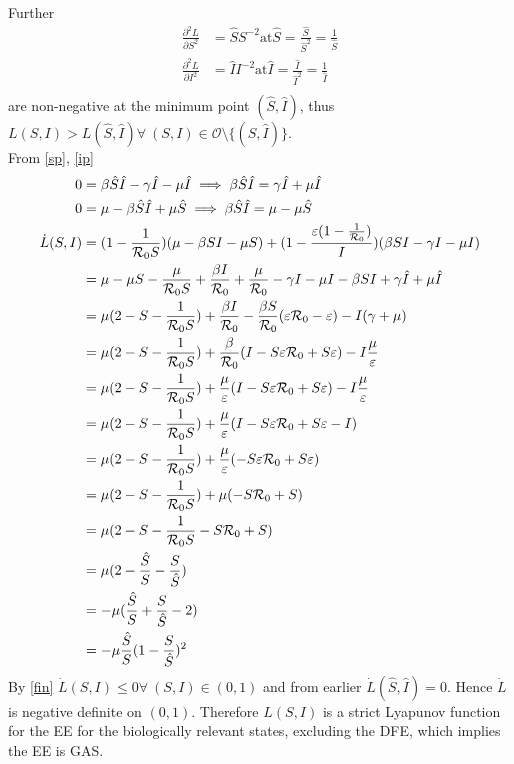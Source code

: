 Further
\begin{align}
    \frac{\partial^2 L}{\partial S^2} &= \hat{S}S^{-2} \textrm{at} \hat{S} = \frac{\hat{S}}{\hat{S}^2} = \frac{1}{\hat{S}}\nonumber\\
    \frac{\partial^2 L}{\partial I^2} &= \hat{I}I^{-2} \textrm{at} \hat{I} = \frac{\hat{I}}{\hat{I}^2} = \frac{1}{\hat{I}}\nonumber\\
\end{align}
are non-negative at the minimum point $(\hat{S},\hat{I})$, thus $L(S,I) > L(\hat{S},\hat{I}) \forall\ (S,I) \in {\mathcal O} \setminus \{(\hat{S},\hat{I})\}$.\\
From \ref{sp}, \ref{ip}
\begin{align}
    0 &= \beta \hat{S} \hat{I} - \gamma \hat{I} - \mu \hat{I} \implies \beta \hat{S} \hat{I} = \gamma \hat{I} + \mu \hat{I}\nonumber\\
    0 &= \mu - \beta \hat{S} \hat{I} + \mu \hat{S} \implies \beta \hat{S} \hat{I} = \mu - \mu \hat{S}\nonumber\\
    \dot{L}(S,I) &= (1-\frac{1}{{\mathcal R_0} S})(\mu - \beta SI - \mu S) + (1 - \frac{\varepsilon(1 - \frac{1}{{\mathcal R_0}})}{I})(\beta SI - \gamma I - \mu I)\nonumber\\
            &= \mu - \mu S - \frac{\mu}{{\mathcal R_0} S } + \frac{\beta I}{{\mathcal R_0}} + \frac{\mu}{{\mathcal R_0}} - \gamma I - \mu I - \beta S I + \gamma \hat{I} + \mu \hat{I}\nonumber\\
            &= \mu(2 - S - \frac{1}{{\mathcal R_0} S}) + \frac{\beta I}{{\mathcal R_0}} - \frac{\beta S}{\mathcal R_0}(\varepsilon{\mathcal R_0}-\varepsilon) - I(\gamma+\mu)\nonumber\\
            &= \mu(2 - S - \frac{1}{{\mathcal R_0} S}) + \frac{\beta}{{\mathcal R_0}}(I - S\varepsilon {\mathcal R_0} + S \varepsilon) - I \frac{\mu}{\varepsilon}\nonumber\\
            &= \mu(2 - S - \frac{1}{{\mathcal R_0} S}) + \frac{\mu}{\varepsilon}(I - S\varepsilon {\mathcal R_0} + S \varepsilon) - I \frac{\mu}{\varepsilon}\nonumber\\
            &= \mu(2 - S - \frac{1}{{\mathcal R_0} S}) + \frac{\mu}{\varepsilon}(I - S\varepsilon {\mathcal R_0} + S \varepsilon -I) \nonumber\\
            &= \mu(2 - S - \frac{1}{{\mathcal R_0} S}) + \frac{\mu}{\varepsilon}(-S\varepsilon {\mathcal R_0} + S \varepsilon) \nonumber\\
            &= \mu(2 - S - \frac{1}{{\mathcal R_0} S}) + \mu(-S {\mathcal R_0} + S) \nonumber\\
            &= \mu(2 - S - \frac{1}{{\mathcal R_0} S} -S {\mathcal R_0} + S) \nonumber\\
            &= \mu(2 - \frac{\hat{S}}{S} - \frac{S}{\hat{S}})\nonumber\\
            &= -\mu( \frac{\hat{S}}{S} + \frac{S}{\hat{S}}-2)\nonumber\\
            &= -\mu\frac{\hat{S}}{S}(1- \frac{S}{\hat{S}})^2\label{fin}
\end{align}
By \ref{fin} $\dot{L}(S,I) \leq 0 \forall\ (S,I) \in (0,1)$ and from earlier $\dot{L}(\hat{S},\hat{I}) = 0$.
Hence $\dot{L}$ is negative definite on $(0,1)$.
Therefore $L(S,I)$ is a strict Lyapunov function for the EE for the biologically relevant states, excluding the DFE, which implies the EE is GAS.
